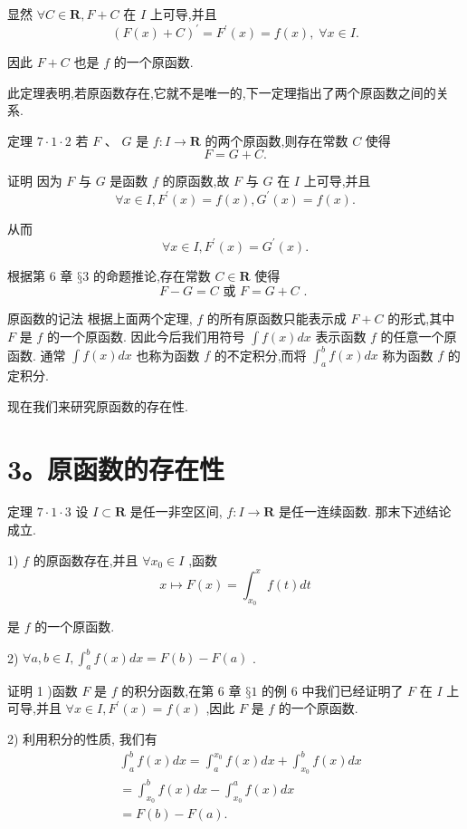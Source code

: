 显然 $\forall C \in  \mathbf{R},F + C$ 在 $I$ 上可导,并且
$${\left( F\left( x\right)  + C\right) }^{\prime } = {F}^{\prime }\left( x\right)  = f\left( x\right) ,\;\forall x \in  I.$$

因此 $F + C$ 也是 $f$ 的一个原函数.

此定理表明,若原函数存在,它就不是唯一的,下一定理指出了两个原函数之间的关系.

定理 $7 \cdot  1 \cdot  2$ 若 $F\text{ 、 }G$ 是 $f : I \rightarrow  \mathbf{R}$ 的两个原函数,则存在常数 $C$ 使得
$$F = G + C.$$

证明 因为 $F$ 与 $G$ 是函数 $f$ 的原函数,故 $F$ 与 $G$ 在 $I$ 上可导,并且
$$\forall x \in  I,{F}^{\prime }\left( x\right)  = f\left( x\right) ,{G}^{\prime }\left( x\right)  = f\left( x\right) .$$

从而
$$\forall x \in  I,{F}^{\prime }\left( x\right)  = {G}^{\prime }\left( x\right) .$$

根据第 6 章 $§3$ 的命题推论,存在常数 $C \in  \mathbf{R}$ 使得
$$F - G = C\text{ 或 }F = G + C\text{ . }$$

原函数的记法 根据上面两个定理, $f$ 的所有原函数只能表示成 $F + C$ 的形式,其中 $F$ 是 $f$ 的一个原函数. 因此今后我们用符号 $\int f\left( x\right) {dx}$ 表示函数 $f$ 的任意一个原函数. 通常 $\int f\left( x\right) {dx}$ 也称为函数 $f$ 的不定积分,而将 ${\int }_{a}^{b}f\left( x\right) {dx}$ 称为函数 $f$ 的定积分.

现在我们来研究原函数的存在性.

\section*{3。原函数的存在性}

定理 $7 \cdot  1 \cdot  3$ 设 $I \subset  \mathbf{R}$ 是任一非空区间, $f : I \rightarrow  \mathbf{R}$ 是任一连续函数. 那末下述结论成立.

1) $f$ 的原函数存在,并且 $\forall {x}_{0} \in  I$ ,函数
$$x \mapsto  F\left( x\right)  = {\int }_{{x}_{0}}^{x}f\left( t\right) {dt}$$

是 $f$ 的一个原函数.

2) $\forall a,b \in  I,{\int }_{a}^{b}f\left( x\right) {dx} = F\left( b\right)  - F\left( a\right)$ .

证明 1 )函数 $F$ 是 $f$ 的积分函数,在第 6 章 $§1$ 的例 6 中我们已经证明了 $F$ 在 $I$ 上可导,并且 $\forall x \in  I,{F}^{\prime }\left( x\right)  = f\left( x\right)$ ,因此 $F$ 是 $f$ 的一个原函数.

2) 利用积分的性质, 我们有
\begin{align*}
	&{\int }_{a}^{b}f\left( x\right) {dx} = {\int }_{a}^{{x}_{0}}f\left( x\right) {dx} + {\int }_{{x}_{0}}^{b}f\left( x\right) {dx}\\
	&= {\int }_{{x}_{0}}^{b}f\left( x\right) {dx} - {\int }_{{x}_{0}}^{a}f\left( x\right) {dx}\\
	&= F\left( b\right)  - F\left( a\right) .
\end{align*}

